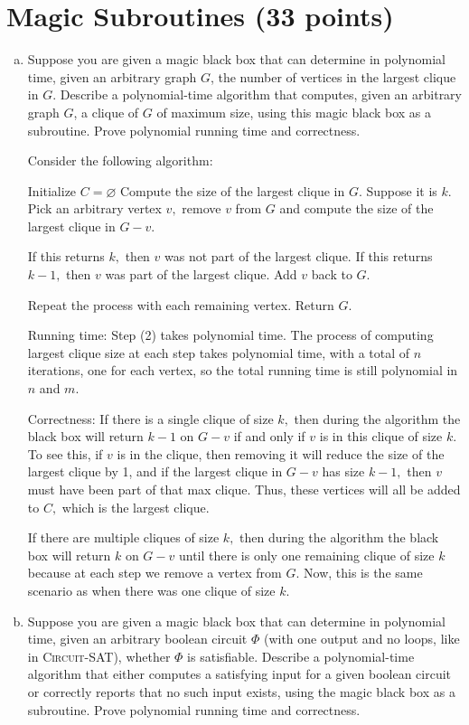 \documentclass{article}
\begin{document}
\section{Magic Subroutines (33 points)}
\begin{enumerate}[(a)]
	\item Suppose you are given a magic black box that can determine in polynomial time, given an arbitrary graph $G$, the number of vertices in the largest clique in $G$. Describe a polynomial-time algorithm that computes, given an arbitrary graph $G$, a clique of $G$ of maximum size, using this magic black box as a subroutine.  Prove polynomial running time and correctness.  
		\begin{soln}
			Consider the following algorithm:
			\begin{enumerate}[(1)]
				\ii Initialize $C=\varnothing$
				\ii Compute the size of the largest clique in $G.$ Suppose it is $k.$
				\ii Pick an arbitrary vertex $v,$ remove $v$ from $G$ and compute the size of the largest clique in $G-v.$
				\begin{enumerate}[(a)]
					\ii If this returns $k,$ then $v$ was not part of the largest clique. 
					\ii If this returns $k-1,$ then $v$ was part of the largest clique. Add $v$ back to $G.$
				\end{enumerate}
				\ii Repeat the process with each remaining vertex.
				\ii Return $G.$
			\end{enumerate}

			Running time: Step (2) takes polynomial time. The process of computing largest clique size at each step takes polynomial time, with a total of $n$ iterations, one for each vertex, so the total running time is still polynomial in $n$ and $m.$

			Correctness:  If there is a single clique of size $k,$ then during the algorithm the black box will return $k-1$ on $G-v$ if and only if $v$ is in this clique of size $k.$ To see this, if $v$ is in the clique, then removing it will reduce the size of the largest clique by 1, and if the largest clique in $G-v$ has size $k-1,$ then $v$ must have been part of that max clique. Thus, these vertices will all be added to $C,$ which is the largest clique.

			If there are multiple cliques of size $k,$ then during the algorithm the black box will return $k$ on $G-v$ until there is only one remaining clique of size $k$ because at each step we remove a vertex from $G.$ Now, this is the same scenario as when there was one clique of size $k.$
		\end{soln}

	\item Suppose you are given a magic black box that can determine in polynomial time, given an arbitrary boolean circuit $\Phi$ (with one output and no loops, like in \textsc{Circuit-SAT}), whether $\Phi$ is satisfiable. Describe a polynomial-time algorithm that either computes a satisfying input for a given boolean circuit or correctly reports that no such input exists, using the magic black box as a subroutine.  Prove polynomial running time and correctness.

\end{enumerate}
\end{document}
